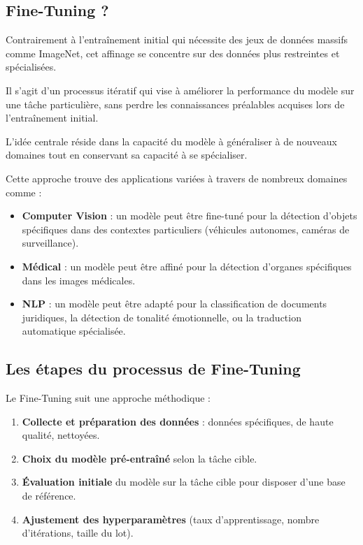 \subsection{Fine-Tuning ?}
Contrairement à l’entraînement initial qui nécessite des jeux de données massifs
comme ImageNet, cet affinage se concentre sur des données plus restreintes et
spécialisées.

Il s’agit d’un processus itératif qui vise à améliorer la performance du modèle
sur une tâche particulière, sans perdre les connaissances préalables acquises lors
de l’entraînement initial.

L’idée centrale réside dans la capacité du modèle à généraliser à de nouveaux domaines
tout en conservant sa capacité à se spécialiser.

Cette approche trouve des applications variées à travers de nombreux domaines comme
:
\begin{itemize}
	\item \textbf{Computer Vision} : un modèle peut être fine-tuné pour la
		détection d’objets spécifiques dans des contextes particuliers (véhicules autonomes,
		caméras de surveillance).

	\item \textbf{Médical} : un modèle peut être affiné pour la détection
		d’organes spécifiques dans les images médicales.

	\item \textbf{NLP} : un modèle peut être adapté pour la classification de
		documents juridiques, la détection de tonalité émotionnelle, ou la
		traduction automatique spécialisée.
\end{itemize}

\subsection*{Les étapes du processus de Fine-Tuning}
Le Fine-Tuning suit une approche méthodique :
\begin{enumerate}
	\item \textbf{Collecte et préparation des données} : données spécifiques, de haute
		qualité, nettoyées.

	\item \textbf{Choix du modèle pré-entraîné} selon la tâche cible.

	\item \textbf{Évaluation initiale} du modèle sur la tâche cible pour disposer
		d'une base de référence.

	\item \textbf{Ajustement des hyperparamètres} (taux d’apprentissage, nombre
		d’itérations, taille du lot).
\end{enumerate}

